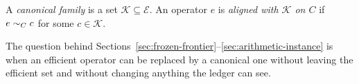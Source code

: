\begin{definition}\label{def:alignment}
A \emph{canonical family} is a set $\mathcal{K}\subseteq\mathcal{E}$. An operator $e$ is \emph{aligned with $\mathcal{K}$ on $C$} if $e\mathrel{\sim_{C}}c$ for some $c\in\mathcal{K}$.
\end{definition}

The question behind Sections~\ref{sec:frozen-frontier}--\ref{sec:arithmetic-instance} is when an efficient operator can be replaced by a canonical one without leaving the efficient set and without changing anything the ledger can see.
